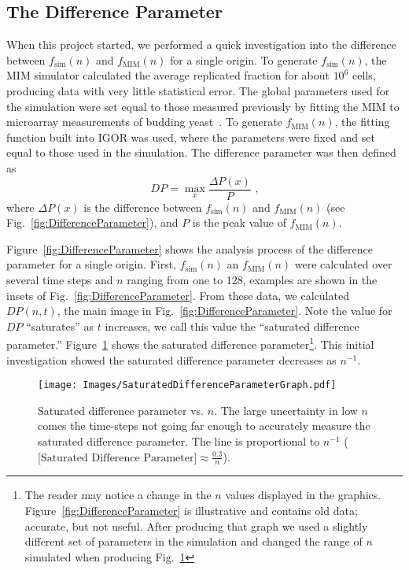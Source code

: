 	
		\subsection{The Difference Parameter}
		\label{subsec:earlywork}
		
		When this project started, we performed a quick investigation into the difference between $f_\text{sim}(n)$ and $f_\text{MIM}(n)$ for a single origin.
		To generate $f_\text{sim}(n)$, the MIM simulator calculated the average replicated fraction for about $10^6$ cells, producing data with very little statistical error.
		The global parameters used for the simulation were set equal to those measured previously by fitting the MIM to microarray measurements of budding yeast~\cite{Scottspaper}.
		To generate $f_\text{MIM}(n)$, the fitting function built into IGOR was used, where the parameters were fixed and set equal to those used in the simulation.
		The difference parameter was then defined as
		\begin{equation} \label{DifferenceParameter}
			DP = \max_{x} {\frac {\Delta P(x)} {P}} \text{ ,}
		\end{equation}
		where $\Delta P(x)$ is the difference between $f_\text{sim}(n)$ and $f_\text{MIM}(n)$ (see Fig.~\ref{fig:DifferenceParameter}), and $P$ is the peak value of $f_\text{MIM}(n)$.
		
		Figure~\ref{fig:DifferenceParameter} shows the analysis process of the difference parameter for a single origin.
		First, $f_\text{sim}(n)$ an $f_\text{MIM}(n)$ were calculated over several time steps and $n$ ranging from one to 128, examples are shown in the insets of Fig.~\ref{fig:DifferenceParameter}.
		From these data, we calculated $DP(n,t)$, the main image in Fig.~\ref{fig:DifferenceParameter}.
		Note the value for $DP$ ``saturates'' as $t$ increases, we call this value the ``saturated difference parameter.''
		Figure~\ref{fig:SaturatedDifferenceParameter} shows the saturated difference parameter\footnote{
		The reader may notice a change in the $n$ values displayed in the graphics. Figure~\ref{fig:DifferenceParameter} is illustrative and contains old data; accurate, but not useful.
		After producing that graph we used a slightly different set of parameters in the simulation and changed the range of $n$ simulated when producing Fig.~\ref{fig:SaturatedDifferenceParameter}}.
		This initial investigation showed the saturated difference parameter decreases as $n^{-1}$.
		
		\begin{figure}[tbh]
			\begin{center}
				\texttt{[image: Images/SaturatedDifferenceParameterGraph.pdf]}
			\end{center}
				\caption[Saturated Difference Parameter]{\label{fig:SaturatedDifferenceParameter} Saturated difference parameter vs. $n$.
				The large uncertainty in low $n$ comes the time-steps not going far enough to accurately measure the saturated difference parameter.
				The line is proportional to $n^{-1}$ ($\text{[Saturated Difference Parameter]} \approx \frac{0.3}{n}$).
				}
		\end{figure}
		
